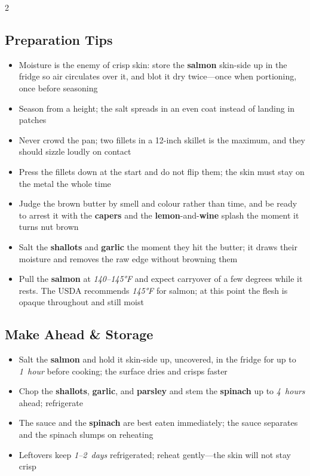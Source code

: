 \documentclass[11pt,letterpaper]{article}
\begin{document}
{\begin{multicols}{2}
\subsection*{Preparation Tips}
\begin{itemize}
    \item Moisture is the enemy of crisp skin: store the \textbf{salmon} skin-side up in the fridge so air circulates over it, and blot it dry twice---once when portioning, once before seasoning
    \item Season from a height; the salt spreads in an even coat instead of landing in patches
    \item Never crowd the pan; two fillets in a 12-inch skillet is the maximum, and they should sizzle loudly on contact
    \item Press the fillets down at the start and do not flip them; the skin must stay on the metal the whole time
    \item Judge the brown butter by smell and colour rather than time, and be ready to arrest it with the \textbf{capers} and the \textbf{lemon}-and-\textbf{wine} splash the moment it turns nut brown
    \item Salt the \textbf{shallots} and \textbf{garlic} the moment they hit the butter; it draws their moisture and removes the raw edge without browning them
    \item Pull the \textbf{salmon} at \textit{140--145°F} and expect carryover of a few degrees while it rests. The USDA recommends \textit{145°F} for salmon; at this point the flesh is opaque throughout and still moist
\end{itemize}

\subsection*{Make Ahead \& Storage}
\begin{itemize}
    \item Salt the \textbf{salmon} and hold it skin-side up, uncovered, in the fridge for up to \textit{1~hour} before cooking; the surface dries and crisps faster
    \item Chop the \textbf{shallots}, \textbf{garlic}, and \textbf{parsley} and stem the \textbf{spinach} up to \textit{4~hours} ahead; refrigerate
    \item The sauce and the \textbf{spinach} are best eaten immediately; the sauce separates and the spinach slumps on reheating
    \item Leftovers keep \textit{1--2~days} refrigerated; reheat gently---the skin will not stay crisp
\end{itemize}


\end{multicols}}
\end{document}
